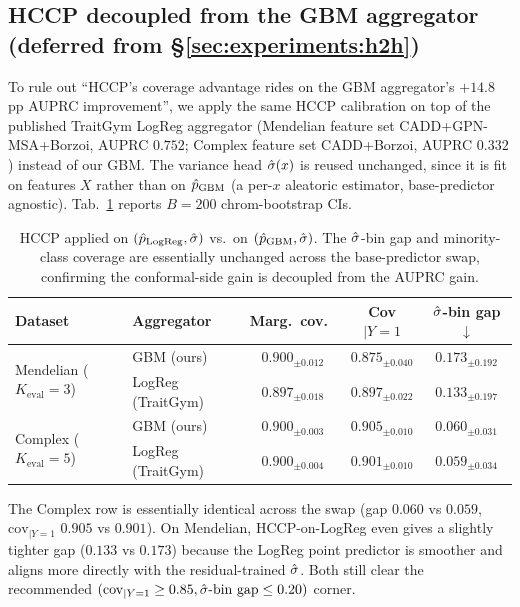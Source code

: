 \subsection{HCCP decoupled from the GBM aggregator (deferred from \S\ref{sec:experiments:h2h})}
\label{app:tables:hccp_logreg}

To rule out ``HCCP's coverage advantage rides on the GBM aggregator's $+14.8$\,pp AUPRC improvement'', we apply the same HCCP calibration on top of the published TraitGym LogReg aggregator (Mendelian feature set CADD+GPN-MSA+Borzoi, AUPRC $0.752$; Complex feature set CADD+Borzoi, AUPRC $0.332$) instead of our GBM. The variance head $\hat{\sigma}(x)$ is reused unchanged, since it is fit on features $X$ rather than on $\hat{p}_{\mathrm{GBM}}$ (a per-$x$ aleatoric estimator, base-predictor agnostic). Tab.~\ref{tab:hccp_logreg} reports $B=200$ chrom-bootstrap CIs.

\begin{table}[h]
\centering
\small
\caption{HCCP applied on $(\hat{p}_{\mathrm{LogReg}}, \hat{\sigma})$ vs.\ on $(\hat{p}_{\mathrm{GBM}}, \hat{\sigma})$. The $\hat{\sigma}$-bin gap and minority-class coverage are essentially unchanged across the base-predictor swap, confirming the conformal-side gain is decoupled from the AUPRC gain.}
\label{tab:hccp_logreg}
\setlength{\tabcolsep}{4pt}
\begin{tabular}{llccc}
\toprule
Dataset & Aggregator & Marg.\ cov.\ & Cov$|Y{=}1$ & $\hat{\sigma}$-bin gap $\downarrow$ \\
\midrule
\multirow{2}{*}{Mendelian ($K_{\mathrm{eval}} = 3$)}
 & GBM (ours)            & $0.900_{\pm 0.012}$ & $0.875_{\pm 0.040}$ & $0.173_{\pm 0.192}$ \\
 & LogReg (TraitGym)     & $0.897_{\pm 0.018}$ & $0.897_{\pm 0.022}$ & $0.133_{\pm 0.197}$ \\
\midrule
\multirow{2}{*}{Complex ($K_{\mathrm{eval}} = 5$)}
 & GBM (ours)            & $0.900_{\pm 0.003}$ & $0.905_{\pm 0.010}$ & $0.060_{\pm 0.031}$ \\
 & LogReg (TraitGym)     & $0.900_{\pm 0.004}$ & $0.901_{\pm 0.010}$ & $0.059_{\pm 0.034}$ \\
\bottomrule
\end{tabular}
\end{table}

The Complex row is essentially identical across the swap (gap $0.060$ vs $0.059$, $\mathrm{cov}_{|Y=1}$ $0.905$ vs $0.901$). On Mendelian, HCCP-on-LogReg even gives a slightly tighter gap ($0.133$ vs $0.173$) because the LogReg point predictor is smoother and aligns more directly with the residual-trained $\hat{\sigma}$. Both still clear the recommended $(\mathrm{cov}_{|Y=1} \geq 0.85, \hat{\sigma}\text{-bin gap} \leq 0.20)$ corner.

